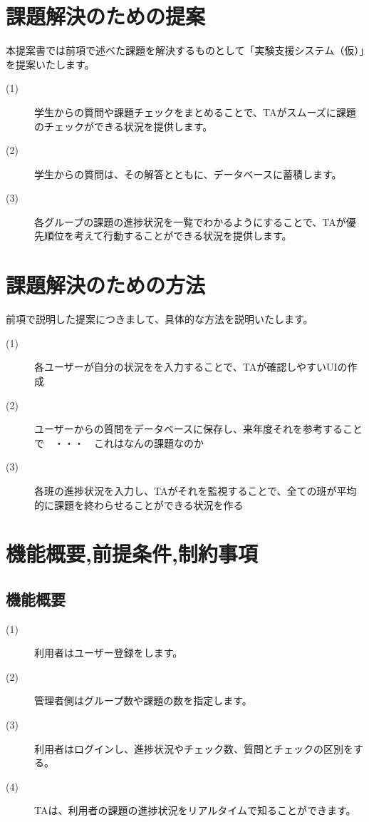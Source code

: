 \documentclass[a4j,titlepage]{ujarticle}
\begin{document}
\section{課題解決のための提案}
本提案書では前項で述べた課題を解決するものとして「実験支援システム（仮）」を提案いたします。

\begin{description}
\item[(1)]学生からの質問や課題チェックをまとめることで、TAがスムーズに課題のチェックができる状況を提供します。
\item[(2)]学生からの質問は、その解答とともに、データベースに蓄積します。
\item[(3)]各グループの課題の進捗状況を一覧でわかるようにすることで、TAが優先順位を考えて行動することができる状況を提供します。
\end{description}

\section{課題解決のための方法}
前項で説明した提案につきまして、具体的な方法を説明いたします。
\begin{description}
\item[(1)]各ユーザーが自分の状況をを入力することで、TAが確認しやすいUIの作成 %
\item[(2)]ユーザーからの質問をデータベースに保存し、来年度それを参考することで　・・・　これはなんの課題なのか
\item[(3)]各班の進捗状況を入力し、TAがそれを監視することで、全ての班が平均的に課題を終わらせることができる状況を作る
\end{description}
\section{機能概要,前提条件,制約事項}

\subsection{機能概要}
\begin{description}
\item[(1)]利用者はユーザー登録をします。
\item[(2)]管理者側はグループ数や課題の数を指定します。
\item[(3)]利用者はログインし、進捗状況やチェック数、質問とチェックの区別をする。 %
\item[(4)]TAは、利用者の課題の進捗状況をリアルタイムで知ることができます。
\end{description}
\end{document}
